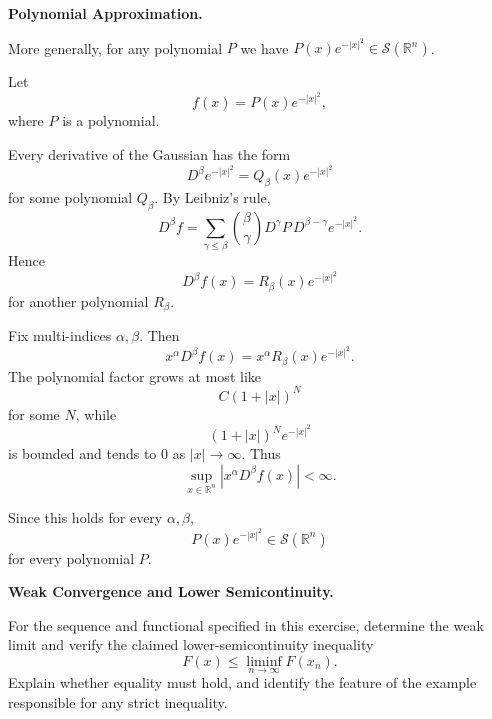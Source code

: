 \begin{problem}[CP-II-0231]
\label{prob:cp-ii-0231}
\textbf{Polynomial Approximation.}

\hspace*{1.5em}More generally, for any polynomial $P$ we have
	$P(x)e^{-|x|^2}\in\mathcal{S}(\mathbb{R}^n)$.
\end{problem}

\begin{solution}
Let
\[
f(x)=P(x)e^{-|x|^2},
\]
where \(P\) is a polynomial.

Every derivative of the Gaussian has the form
\[
D^\beta e^{-|x|^2}
=
Q_\beta(x)e^{-|x|^2}
\]
for some polynomial \(Q_\beta\). By Leibniz's rule,
\[
D^\beta f
=
\sum_{\gamma\le\beta}
{\beta\choose\gamma}
D^\gamma P\,
D^{\beta-\gamma}e^{-|x|^2}.
\]
Hence
\[
D^\beta f(x)
=
R_\beta(x)e^{-|x|^2}
\]
for another polynomial \(R_\beta\).

Fix multi-indices \(\alpha,\beta\). Then
\[
x^\alpha D^\beta f(x)
=
x^\alpha R_\beta(x)e^{-|x|^2}.
\]
The polynomial factor grows at most like
\[
C(1+|x|)^N
\]
for some \(N\), while
\[
(1+|x|)^Ne^{-|x|^2}
\]
is bounded and tends to \(0\) as \(|x|\to\infty\). Thus
\[
\sup_{x\in\mathbb R^n}
|x^\alpha D^\beta f(x)|
<\infty.
\]

Since this holds for every \(\alpha,\beta\),
\[
\boxed{
P(x)e^{-|x|^2}\in\mathcal S(\mathbb R^n)
}
\]
for every polynomial \(P\).
\end{solution}


\begin{problem}[CP-II-0232]
\label{prob:cp-ii-0232}
\textbf{Weak Convergence and Lower Semicontinuity.}

\hspace*{1.5em}For the sequence and functional specified in this exercise, determine the weak
limit and verify the claimed lower-semicontinuity inequality
\[
F(x)\le\liminf_{n\to\infty}F(x_n).
\]
Explain whether equality must hold, and identify the feature of the example
responsible for any strict inequality.
\end{problem}

